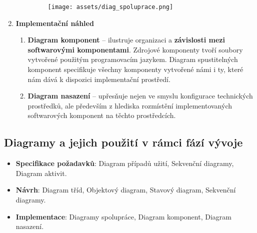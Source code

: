 \begin{enumerate}
\begin{enumerate}
\begin{figure}[H]
	\centering
	\texttt{[image: assets/diag\_spoluprace.png]}
\end{figure}
\end{enumerate}
\item \textbf{Implementační náhled}
\begin{enumerate}
\item \textbf{Diagram komponent} -- ilustruje organizaci a \textbf{závislosti mezi softwarovými komponentami}. Zdrojové komponenty tvoří soubory vytvořené použitým programovacím jazykem. Diagram spustitelných komponent specifikuje všechny komponenty vytvořené námi i ty, které nám dává k dispozici implementační prostředí.
\item \textbf{Diagram nasazení} -- upřesňuje nejen ve smyslu konfigurace technických prostředků, ale především z hlediska rozmístění implementovaných softwarových komponent na těchto prostředcích.
\end{enumerate}
\end{enumerate}


\subsection{Diagramy a jejich použití v rámci fází vývoje}
\begin{itemize}
\item \textbf{Specifikace požadavků}: Diagram případů užití, Sekvenční diagramy, Diagram aktivit.
\item \textbf{Návrh}: Diagram tříd, Objektový diagram, Stavový diagram, Sekvenční diagramy.
\item \textbf{Implementace}: Diagramy spolupráce, Diagram komponent, Diagram nasazení.
\end{itemize}
